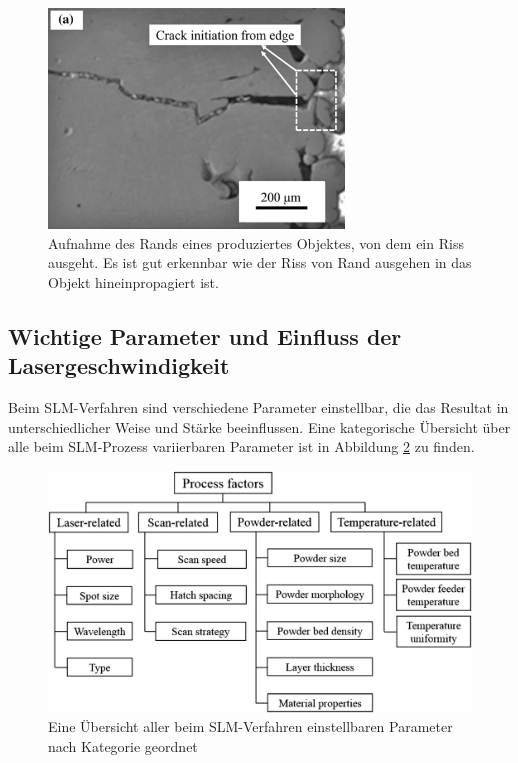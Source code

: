 		\begin{figure}[ht]
			\centering
			\includegraphics[width=0.7\textwidth]{chapter/main/img/defects/cracks_part.png}
			\caption{Aufnahme des Rands eines produziertes Objektes, von dem ein Riss ausgeht. Es
			ist gut erkennbar wie der Riss von Rand ausgehen in das Objekt hineinpropagiert ist.
			\cite{zhang2017defect}}
			\label{fig:defects_cracks}
		\end{figure}

	\subsection{Wichtige Parameter und Einfluss der Lasergeschwindigkeit}
		Beim SLM-Verfahren sind verschiedene Parameter einstellbar, die das Resultat in
		unterschiedlicher Weise und Stärke beeinflussen. Eine kategorische Übersicht über alle
		beim SLM-Prozess variierbaren Parameter ist in Abbildung \ref{fig:scheme_parameters} zu
		finden.

		\begin{figure}[ht]
			\centering
			\includegraphics[width=\textwidth]{chapter/main/img/scheme_parameters_2.png}
			\caption{Eine Übersicht aller beim SLM-Verfahren einstellbaren Parameter nach
			Kategorie geordnet \cite{zhang2017defect,aboulkhair2014reducing}}
			\label{fig:scheme_parameters}
		\end{figure}

